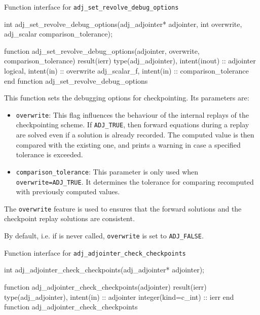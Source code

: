\begin{boxwithtitle}{Function interface for \texttt{adj_set_revolve_debug_options}}
\begin{minipage}{\columnwidth}
\begin{ccode}
int adj_set_revolve_debug_options(adj_adjointer* adjointer, int overwrite, 
                                  adj_scalar comparison_tolerance);
\end{ccode}
\begin{fortrancode}
function adj_set_revolve_debug_options(adjointer, overwrite, comparison_tolerance) 
                                      result(ierr)
  type(adj_adjointer), intent(inout) :: adjointer
  logical, intent(in) :: overwrite
  adj_scalar_f, intent(in) :: comparison_tolerance
end function adj_set_revolve_debug_options
\end{fortrancode}
\end{minipage}
\end{boxwithtitle}

This function sets the debugging options for checkpointing. Its parameters are: 
\begin{itemize}
\item \texttt{overwrite}: This flag influences the behaviour of the internal replays of the checkpointing scheme. If \texttt{ADJ_TRUE}, then forward equations during a replay are solved even if a solution is already recorded. The computed value is then compared with the existing one, and prints a warning in case a specified tolerance is exceeded.
\item \texttt{comparison_tolerance}: This parameter is only used when \texttt{overwrite=ADJ_TRUE}. It determines the tolerance for comparing recomputed with previously computed values.
\end{itemize}
The \texttt{overwrite} feature is used to ensures that the forward solutions and the checkpoint replay solutions are consistent.

By default, i.e. if  is never called, \texttt{overwrite} is set to \texttt{ADJ_FALSE}.

\begin{boxwithtitle}{Function interface for \texttt{adj_adjointer_check_checkpoints}}
\begin{minipage}{\columnwidth}
\begin{ccode}
int adj_adjointer_check_checkpoints(adj_adjointer* adjointer);
\end{ccode}
\begin{fortrancode}
function adj_adjointer_check_checkpoints(adjointer) result(ierr) 
  type(adj_adjointer), intent(in) :: adjointer
  integer(kind=c_int) :: ierr
end function adj_adjointer_check_checkpoints
\end{fortrancode}
\end{minipage}
\end{boxwithtitle}

